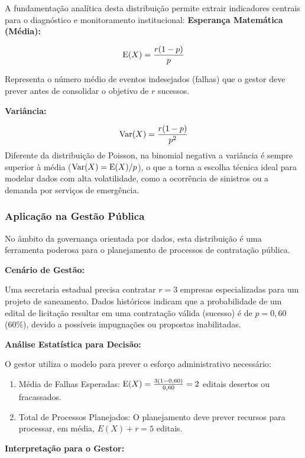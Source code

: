 
A fundamentação analítica desta distribuição permite extrair indicadores centrais para o diagnóstico e monitoramento institucional:
\textbf{Esperança Matemática (Média):}

$$\operatorname{E}(X)=\frac{r(1-p)}{p}$$

Representa o número médio de eventos indesejados (falhas) que o gestor deve prever antes de consolidar o objetivo de $r$ sucessos.

\textbf{Variância:}

$$\operatorname{Var}(X)=\frac{r(1-p)}{p^2}$$Diferente da distribuição de Poisson, na binomial negativa a variância é sempre superior à média ($\operatorname{Var}(X) = \operatorname{E}(X)/p$), o que a torna a escolha técnica ideal para modelar dados com alta volatilidade, como a ocorrência de sinistros ou a demanda por serviços de emergência.

\subsubsection*{Aplicação na Gestão Pública}

No âmbito da governança orientada por dados, esta distribuição é uma ferramenta poderosa para o planejamento de processos de contratação pública. \vskip0.3cm

\textbf{Cenário de Gestão:}  \vskip0.3cm

Uma secretaria estadual precisa contratar $r=3$ empresas especializadas para um projeto de saneamento. Dados históricos indicam que a probabilidade de um edital de licitação resultar em uma contratação válida (sucesso) é de $p=0,60$ (60\%), devido a possíveis impugnações ou propostas inabilitadas. \vskip0.3cm


\textbf{Análise Estatística para Decisão:} \vskip0.3cm

O gestor utiliza o modelo para prever o esforço administrativo necessário: \vskip0.3cm

\begin{enumerate}
    \item Média de Falhas Esperadas: $\operatorname{E}(X) = \frac{3(1-0,60)}{0,60} = 2$ editais desertos ou fracassados.
    \item Total de Processos Planejados: O planejamento deve prever recursos para processar, em média, $E(X) + r = 5$ editais. 
\end{enumerate}

\textbf{Interpretação para o Gestor:} \vskip0.3cm

